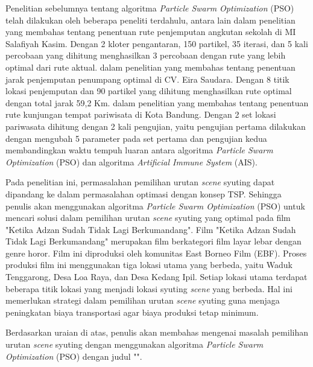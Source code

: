 {    %
    Penelitian sebelumnya tentang algoritma \textit{Particle Swarm Optimization} (PSO) telah dilakukan oleh beberapa peneliti terdahulu, antara lain \textcite{Azhari:2018} dalam penelitian yang membahas tentang penentuan rute penjemputan angkutan sekolah di MI Salafiyah Kasim.
    Dengan 2 kloter pengantaran, 150 partikel, 35 iterasi, dan 5 kali percobaan yang dihitung menghasilkan 3 percobaan dengan rute yang lebih optimal dari rute aktual.
    \textcite{Natalia:2019} dalam penelitian yang membahas tentang penentuan jarak penjemputan penumpang optimal di CV. Eira Saudara.
    Dengan 8 titik lokasi penjemputan dan 90 partikel yang dihitung menghasilkan rute optimal dengan total jarak 59,2 Km.
    \textcite{Dalyono:2017} dalam penelitian yang membahas tentang penentuan rute kunjungan tempat pariwisata di Kota Bandung.
    Dengan 2 set lokasi pariwasata dihitung dengan 2 kali pengujian, yaitu pengujian pertama dilakukan dengan mengubah 5 parameter pada set pertama dan pengujian kedua membandingkan waktu tempuh luaran antara algoritma \textit{Particle Swarm Optimization} (PSO) dan algoritma \textit{Artificial Immune System} (AIS).

    Pada penelitian ini, permasalahan pemilihan urutan \textit{scene} syuting dapat dipandang ke dalam permasalahan optimasi dengan konsep TSP.
    Sehingga penulis akan menggunakan algoritma \textit{Particle Swarm Optimization} (PSO) untuk mencari solusi dalam pemilihan urutan \textit{scene} syuting yang optimal pada film "Ketika Adzan Sudah Tidak Lagi Berkumandang".
    Film "Ketika Adzan Sudah Tidak Lagi Berkumandang" merupakan film berkategori film layar lebar dengan genre horor.
    Film ini diproduksi oleh komunitas East Borneo Film (EBF).
    Proses produksi film ini menggunakan tiga lokasi utama yang berbeda, yaitu Waduk Tenggarong, Desa Loa Raya, dan Desa Kedang Ipil.
    Setiap lokasi utama terdapat beberapa titik lokasi yang menjadi lokasi syuting \textit{scene} yang berbeda.
    Hal ini memerlukan strategi dalam pemilihan urutan \textit{scene} syuting guna menjaga peningkatan biaya transportasi agar biaya produksi tetap minimum.

    Berdasarkan uraian di atas, penulis akan membahas mengenai masalah pemilihan urutan \textit{scene} syuting dengan menggunakan algoritma \textit{Particle Swarm Optimization} (PSO) dengan judul
    "\judul".
}
\vspace{-4mm}

